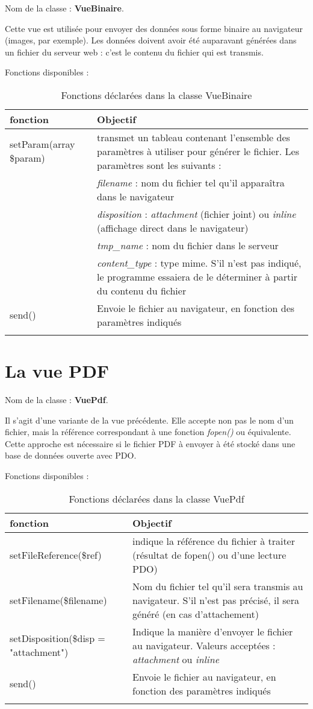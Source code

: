 Nom de la classe : \textbf{VueBinaire}.

Cette vue est utilisée pour envoyer des données sous forme binaire au navigateur (images, par exemple). Les données doivent avoir été auparavant générées dans un fichier du serveur web : c'est le contenu du fichier qui est transmis.

Fonctions disponibles : 
\begin{longtable}{|p{5cm}|p{8cm}|}
\hline
\textbf{fonction} & \textbf{Objectif} \\
\hline
\endhead
setParam(array \$param) & transmet un tableau contenant l'ensemble des paramètres à utiliser pour générer le fichier. Les paramètres sont les suivants : \\
& \textit{filename} : nom du fichier tel qu'il apparaîtra dans le navigateur \\
& \textit{disposition} : \textit{attachment} (fichier joint) ou \textit{inline} (affichage direct dans le navigateur) \\
& \textit{tmp\_name} : nom du fichier dans le serveur \\
& \textit{content\_type} : type mime. S'il n'est pas indiqué, le programme essaiera de le déterminer à partir du contenu du fichier \\
\hline
send() & Envoie le fichier au navigateur, en fonction des paramètres indiqués \\
\hline
\caption{Fonctions déclarées dans la classe VueBinaire}
\end{longtable}

\section{La vue PDF}

Nom de la classe : \textbf{VuePdf}.

Il s'agit d'une variante de la vue précédente. Elle accepte non pas le nom d'un fichier, mais la référence correspondant à une fonction \textit{fopen()} ou équivalente. Cette approche est nécessaire si le fichier PDF à envoyer à été stocké dans une base de données ouverte avec PDO.

Fonctions disponibles :
\begin{longtable}{|p{5cm}|p{8cm}|}
\hline
\textbf{fonction} & \textbf{Objectif} \\
\hline
\endhead

setFileReference(\$ref)& indique la référence du fichier à traiter (résultat de fopen() ou d'une lecture PDO)\\
\hline
setFilename(\$filename)& Nom du fichier tel qu'il sera transmis au navigateur. S'il n'est pas précisé, il sera généré (en cas d'attachement) \\
\hline
setDisposition(\$disp = "attachment")& Indique la manière d'envoyer le fichier au navigateur. Valeurs acceptées : \textit{attachment} ou \textit{inline}\\
\hline
send() & Envoie le fichier au navigateur, en fonction des paramètres indiqués \\
\hline
\caption{Fonctions déclarées dans la classe VuePdf}
\end{longtable}

